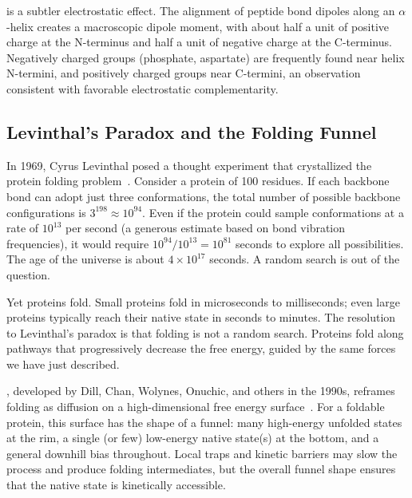  is a subtler electrostatic effect.  The alignment of peptide bond dipoles along an $\alpha$-helix creates a macroscopic dipole moment, with about half a unit of positive charge at the N-terminus and half a unit of negative charge at the C-terminus.  Negatively charged groups (phosphate, aspartate) are frequently found near helix N-termini, and positively charged groups near C-termini, an observation consistent with favorable electrostatic complementarity.

\subsection{Levinthal's Paradox and the Folding Funnel}
\label{sec:levinthal}

In 1969, Cyrus Levinthal posed a thought experiment that crystallized the protein folding problem~\cite{levinthal1969}.  Consider a protein of 100 residues.  If each backbone bond can adopt just three conformations, the total number of possible backbone configurations is $3^{198} \approx 10^{94}$.  Even if the protein could sample conformations at a rate of $10^{13}$ per second (a generous estimate based on bond vibration frequencies), it would require $10^{94}/10^{13} = 10^{81}$ seconds to explore all possibilities.  The age of the universe is about $4 \times 10^{17}$ seconds.  A random search is out of the question.

Yet proteins fold.  Small proteins fold in microseconds to milliseconds; even large proteins typically reach their native state in seconds to minutes.  The resolution to Levinthal's paradox is that folding is not a random search.  Proteins fold along pathways that progressively decrease the free energy, guided by the same forces we have just described.

, developed by Dill, Chan, Wolynes, Onuchic, and others in the 1990s, reframes folding as diffusion on a high-dimensional free energy surface~\cite{dill1997}.  For a foldable protein, this surface has the shape of a funnel: many high-energy unfolded states at the rim, a single (or few) low-energy native state(s) at the bottom, and a general downhill bias throughout.  Local traps and kinetic barriers may slow the process and produce folding intermediates, but the overall funnel shape ensures that the native state is kinetically accessible.

